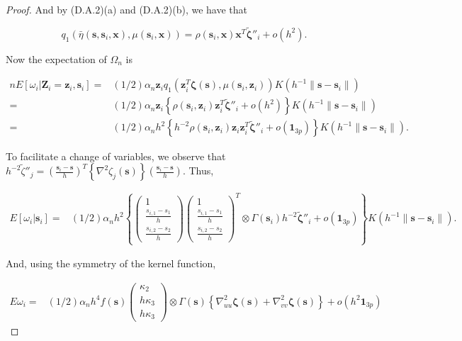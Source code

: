 \documentclass[authoryear,review, 12pt]{elsarticle}
\begin{document}
\begin{proof}
And by (D.A.2)(a) and (D.A.2)(b), we have that

\[
q_{1}\left(\bar{\eta}\left(\bm{s},\bm{s}_{i},\bm{x}\right),\mu\left(\bm{s}_{i},\bm{x}\right)\right)=\rho\left(\bm{s}_{i},\bm{x}\right)\bm{x}^{T}\tilde{\bm{\zeta}}''_{i}+o\left(h^{2}\right).
\]


Now the expectation of $\Omega_{n}$ is 

\begin{align*}
nE\left[\omega_{i}|\bm{Z}_{i}=\bm{z}_{i},\bm{s}_{i}\right]= & \left(1/2\right)\alpha_{n}\bm{z}_{i}q_{1}\left(\bm{z}_{i}^{T}\bm{\zeta}\left(\bm{s}\right),\mu\left(\bm{s}_{i},\bm{z}_{i}\right)\right)K\left(h^{-1}\|\bm{s}-\bm{s}_{i}\|\right)\\
= & \left(1/2\right)\alpha_{n}\bm{z}_{i}\left\{ \rho\left(\bm{s}_{i},\bm{z}_{i}\right)\bm{z}_{i}^{T}\tilde{\bm{\zeta}}''_{i}+o\left(h^{2}\right)\right\} K\left(h^{-1}\|\bm{s}-\bm{s}_{i}\|\right)\\
= & \left(1/2\right)\alpha_{n}h^{2}\left\{ h^{-2}\rho\left(\bm{s}_{i},\bm{z}_{i}\right)\bm{z}_{i}\bm{z}_{i}^{T}\tilde{\bm{\zeta}}''_{i}+o\left(\bm{1}_{3p}\right)\right\} K\left(h^{-1}\|\bm{s}-\bm{s}_{i}\|\right).
\end{align*}


To facilitate a change of variables, we observe that $h^{-2}\tilde{\zeta}''_{j}=\left(\frac{\bm{s}_{i}-\bm{s}}{h}\right)^{T}\left\{ \nabla^{2}\zeta_{j}\left(\bm{s}\right)\right\} \left(\frac{\bm{s}_{i}-\bm{s}}{h}\right)$.
Thus,

\begin{align*}
E\left[\omega_{i}|\bm{s}_{i}\right]= & \left(1/2\right)\alpha_{n}h^{2}\left\{ \left(\begin{array}{c}
1\\
\frac{s_{i,1}-s_{1}}{h}\\
\frac{s_{i,2}-s_{2}}{h}
\end{array}\right)\left(\begin{array}{c}
1\\
\frac{s_{i,1}-s_{1}}{h}\\
\frac{s_{i,2}-s_{2}}{h}
\end{array}\right)^{T}\otimes\Gamma\left(\bm{s}_{i}\right)h^{-2}\tilde{\bm{\zeta}}''_{i}+o\left(\bm{1}_{3p}\right)\right\} K\left(h^{-1}\|\bm{s}-\bm{s}_{i}\|\right).
\end{align*}


And, using the symmetry of the kernel function,

\begin{align*}
E\omega_{i}= & \left(1/2\right)\alpha_{n}h^{4}f\left(\bm{s}\right)\left(\begin{array}{c}
\kappa_{2}\\
h\kappa_{3}\\
h\kappa_{3}
\end{array}\right)\otimes\Gamma\left(\bm{s}\right)\left\{ \nabla_{uu}^{2}\bm{\zeta}\left(\bm{s}\right)+\nabla_{vv}^{2}\bm{\zeta}\left(\bm{s}\right)\right\} +o\left(h^{2}\bm{1}_{3p}\right)
\end{align*}



\end{proof}
\end{document}
